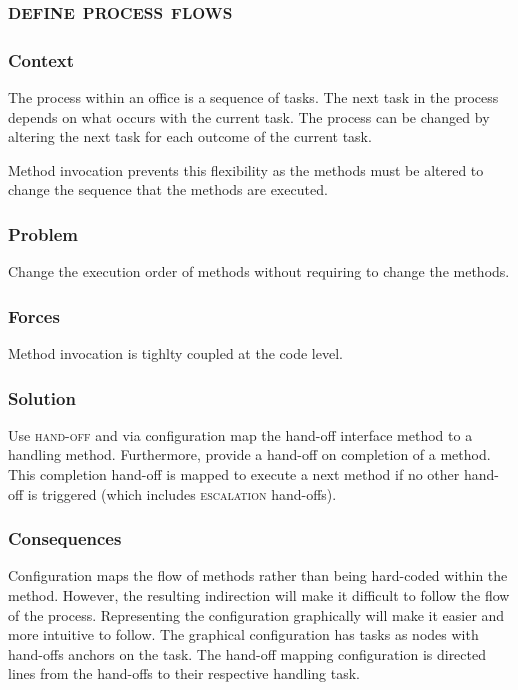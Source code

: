 \documentclass[prodmode]{style/acmlarge}
\begin{document}
\subsection{\textsc{\textbf{define process flows}}}

\subsubsection*{Context} The process within an office is a sequence of tasks.
The next task in the process depends on what occurs with the current task.  The
process can be changed by altering the next task for each outcome of the current
task.

Method invocation prevents this flexibility as the methods must be altered to
change the sequence that the methods are executed.

\subsubsection*{Problem} Change the execution order of methods without requiring
to change the methods.

\subsubsection*{Forces} Method invocation is tighlty coupled at the code level.

\subsubsection*{Solution} Use \textsc{hand-off} and via configuration map the
hand-off interface method to a handling method.  Furthermore, provide a hand-off
on completion of a method.  This completion hand-off is mapped to execute a next
method if no other hand-off is triggered (which includes \textsc{escalation}
hand-offs).

\subsubsection*{Consequences} Configuration maps the flow of methods rather than
being hard-coded within the method.  However, the resulting indirection will
make it difficult to follow the flow of the process.  Representing the
configuration graphically will make it easier and more intuitive to follow.  The
graphical configuration has tasks as nodes with hand-offs anchors on the task. 
The hand-off mapping configuration is directed lines from the hand-offs to their
respective handling task.
\end{document}
